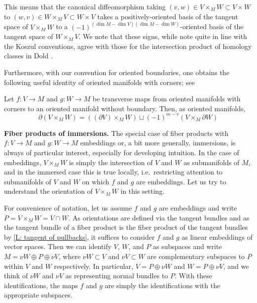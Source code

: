 This means that the canonical diffeomorphism taking $(v,w)\in V\times_MW\subset V\times W$ to $(w,v)\in W\times_MV\subset W\times V$ takes a positively-oriented basis of the tangent space of $V\times_MW$ to a $(-1)^{(\dim M-\dim V)(\dim M-\dim W)}$-oriented basis of the tangent space of $W\times_MV$.
We note that these signs, while note quite in line with the Koszul conventions, agree with those for the intersection product of homology classes in Dold \cite[Section VIII.13]{Dol72}.

Furthermore, with our convention for oriented boundaries, one obtains the following useful identity of oriented manifolds with corners; see \cite[Propositions 7.4 and 7.5]{Joy12}

\begin{proposition}\label{P: oriented fiber boundary}
	Let $f \colon V\to M$ and $g \colon W\to M$ be transverse maps from oriented manifolds with corners to an oriented manifold without boundary.
	Then, as oriented manifolds,
	\begin{equation*}
		\partial (V \times_M W) = ((\partial V )\times_M W )\sqcup (-1)^{m-v}(V \times_M \partial W)
	\end{equation*}
\end{proposition}

\medskip

\noindent\textbf{Fiber products of immersions.}
The special case of fiber products with $f \colon V \to M$ and $g \colon W \to M$ embeddings or, a bit more generally, immersions, is always of particular interest, especially for developing intuition.
In the case of embeddings, $V\times_MW$ is simply the intersection of $V$ and $W$ as submanifolds of $M$, and in the immersed case this is true locally, i.e.\ restricting attention to submanifolds of $V$ and $W$ on which $f$ and $g$ are embeddings.
Let us try to understand the orientation of $V\times_MW$ in this setting.

For convenience of notation, let us assume $f$ and $g$ are embeddings and write $P=V\times_MW=V\cap W$.
As orientations are defined via the tangent bundles and as the tangent bundle of a fiber product is the fiber product of the tangent bundles by \cref{L: tangent of pullbacks}, it suffices to consider $f$ and $g$ as linear embeddings of vector spaces.
Then we can identify $V$, $W$, and $P$ as subspaces and write $M=\nu W\oplus P \oplus \nu V$, where $\nu W\subset V$ and $\nu V\subset W$ are complementary subspaces to $P$ within $V$ and $W$ respectively.
In particular, $V=P\oplus \nu W$ and $W=P\oplus \nu V$, and we think of $\nu W$ and $\nu V$ as representing normal bundles to $P$.
With these identifications, the maps $f$ and $g$ are simply the identifications with the appropriate subspaces.

